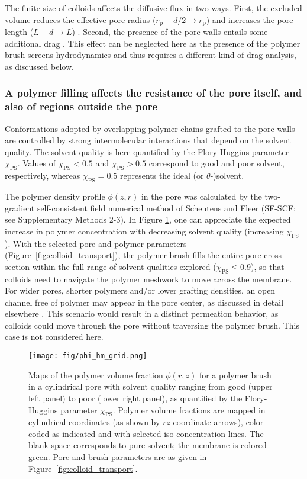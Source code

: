 \documentclass[12pt, a4paper]{article}
\begin{document}
The finite size of colloids affects the diffusive flux in two ways.
First, the excluded volume reduces the effective pore radius ($r_{\text{p}} - d/2\rightarrow r_{\text{p}}$) and increases the pore length ($L + d \rightarrow L$) \cite{Renkin1954, Beck1970, Bungay1973, Anderson1974, Brenner1977}.
Second, the presence of the pore walls entails some additional drag \cite{Ladenburg1907, Faxen1922, Haberman1958}.
This effect can be neglected here as the presence of the polymer brush screens hydrodynamics and thus requires a different kind of drag analysis, as discussed below.


\subsubsection{A polymer filling affects the resistance of the pore itself, and also of regions outside the pore}

Conformations adopted by overlapping polymer chains grafted to the pore walls are controlled by strong intermolecular interactions that depend on the solvent quality.
The solvent quality is here quantified by the Flory-Huggins parameter $\chi_{\text{PS}}$.
Values of $\chi_{\text{PS}}<0.5$ and $\chi_{\text{PS}}>0.5$ correspond to good and poor solvent, respectively, whereas $\chi_{\text{PS}}=0.5$ represents the ideal (or $\theta$-)solvent.

The polymer density profile $\phi(z,r)$ in the pore was calculated by the two-gradient self-consistent field numerical method of Scheutens and Fleer (SF-SCF; see Supplementary Methods 2-3).
In Figure \ref{fig:phi_hm_grid}, one can appreciate the expected increase in polymer concentration with decreasing solvent quality (increasing $\chi_{\text{PS}}$).
With the selected pore and polymer parameters (Figure~\ref{fig:colloid_transport}), the polymer brush fills the entire pore cross-section within the full range of solvent qualities explored ($\chi_{\text{PS}}\le0.9$), so that colloids need to navigate the polymer meshwork to move across the membrane.
For wider pores, shorter polymers and/or lower grafting densities, an open channel free of polymer may appear in the pore center, as discussed in detail elsewhere \cite{Laktionov2021}.
This scenario would result in a distinct permeation behavior, as colloids could move through the pore without traversing the polymer brush.
This case is not considered here.

\begin{figure}
    \centering
    \texttt{[image: fig/phi\_hm\_grid.png]}
    \caption{
    Maps of the polymer volume fraction $\phi(r,z)$ for a polymer brush in a cylindrical pore with solvent quality ranging from good (upper left panel) to poor (lower right panel), as quantified by the Flory-Huggins parameter $\chi_{\text{PS}}$.
    Polymer volume fractions are mapped in cylindrical coordinates (as shown by $rz$-coordinate arrows), color coded as indicated and with selected iso-concentration lines. The blank space corresponds to pure solvent; the membrane is colored green.
    Pore and brush parameters are as given in Figure~\ref{fig:colloid_transport}.
    }
    \label{fig:phi_hm_grid}
\end{figure}
\end{document}
